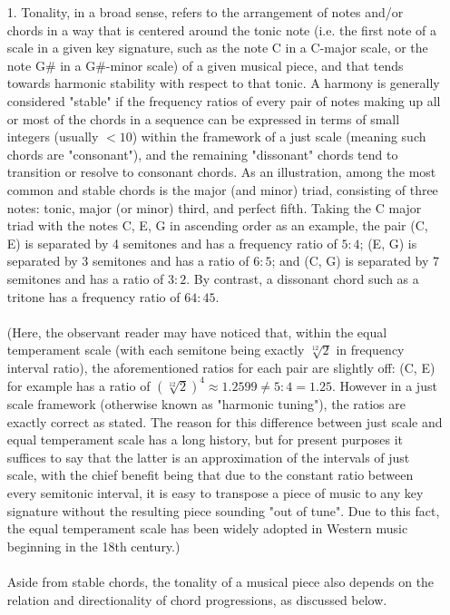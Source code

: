 \documentclass[twoside]{article}
\begin{document}
	\begin{enumerate}
		\item[1.]
		Tonality, in a broad sense, refers to the arrangement of notes and/or chords in a way that is centered around the tonic note (i.e. the first note of a scale in a given key signature, such as the note C in a C-major scale, or the note G\# in a G\#-minor scale) of a given musical piece, and that tends towards harmonic stability with respect to that tonic. A harmony is generally considered "stable" if the frequency ratios of every pair of notes making up all or most of the chords in a sequence can be expressed in terms of small integers (usually $< 10$) within the framework of a just scale (meaning such chords are "consonant"), and the remaining "dissonant" chords tend to transition or resolve to consonant chords. As an illustration, among the most common and stable chords is the major (and minor) triad, consisting of three notes: tonic, major (or minor) third, and perfect fifth. Taking the C major triad with the notes C, E, G in ascending order as an example, the pair (C, E) is separated by 4 semitones and has a frequency ratio of $5:4$; (E, G) is separated by 3 semitones and has a ratio of $6 : 5$; and (C, G) is separated by 7 semitones and has a ratio of $3 : 2$. By contrast, a dissonant chord such as a tritone has a frequency ratio of $64:45$.
		\\\\
		(Here, the observant reader may have noticed that, within the equal temperament scale (with each semitone being exactly $\sqrt[12]{2}$ in frequency interval ratio), the aforementioned ratios for each pair are slightly off: (C, E) for example has a ratio of $\left(\sqrt[12]{2}\right)^4 \approx 1.2599 \neq 5:4 = 1.25$. However in a just scale framework (otherwise known as "harmonic tuning"), the ratios are exactly correct as stated. The reason for this difference between just scale and equal temperament scale has a long history, but for present purposes it suffices to say that the latter is an approximation of the intervals of just scale, with the chief benefit being that due to the constant ratio between every semitonic interval, it is easy to transpose a piece of music to any key signature without the resulting piece sounding "out of tune". Due to this fact, the equal temperament scale has been widely adopted in Western music beginning in the 18th century.)
		\\\\
		Aside from stable chords, the tonality of a musical piece also depends on the relation and directionality of chord progressions, as discussed below.

\end{enumerate}
\end{document}
